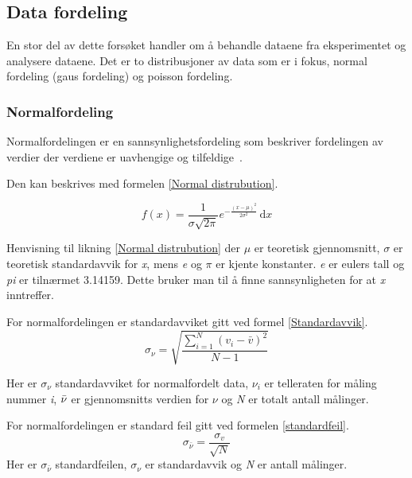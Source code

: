 \documentclass[twocolumn, 11pt]{article} %
\begin{document}
    \subsection{Data fordeling}
    En stor del av dette forsøket handler om å behandle dataene fra eksperimentet og analysere dataene. Det er to distribusjoner av data som er i fokus, normal fordeling (gaus fordeling) og poisson fordeling.

    \subsubsection{Normalfordeling}
    Normalfordelingen er en sannsynlighetsfordeling som beskriver fordelingen av verdier der verdiene er uavhengige og tilfeldige~\cite{normalfordeling}.

    Den kan beskrives med formelen \eqref{Normal distrubution}.

    \begin{equation}
        f(x) = \frac{1}{\sigma\sqrt{2\pi}}{e^{-\frac{(x-\mu)^2}{2\sigma^2}}} \, \mathrm{d}x
    \label{Normal distrubution}
    \end{equation}

    Henvisning til likning \eqref{Normal distrubution} der \textit{$\mu$} er teoretisk gjennomsnitt, \textit{$\sigma$} er teoretisk standardavvik for \textit{x}, mens \textit{e} og \textit{$\pi$} er kjente konstanter. \textit{e} er eulers tall og \textit{pi} er tilnærmet 3.14159. Dette bruker man til å finne sannsynligheten for at \textit{x} inntreffer.

\bigskip

    For normalfordelingen er standardavviket gitt ved formel \eqref{Standardavvik}.
    \begin{equation}
	\sigma_\nu = \sqrt{\frac{\sum_{i=1}^N (v_i - \bar v)^2}{N-1}}\label{Standardavvik}
    \end{equation}

    Her er \textit{$\sigma_\nu$} standardavviket for normalfordelt data, \textit{$\nu_i$} er telleraten for måling nummer \textit{i}, \textit{$\Bar{\nu}$} er gjennomsnitts verdien for \textit{$\nu$} og \textit{N} er totalt antall målinger.

    For normalfordelingen er standard feil gitt ved formelen \eqref{standardfeil}.
    \begin{equation}
	 \sigma_{\bar{\nu}}  = \frac{\sigma_v}{\sqrt{N}}\label{standardfeil}
    \end{equation}
    Her er \textit{$\sigma_{\bar{\nu}}$} standardfeilen, \textit{$\sigma_{\nu}$} er standardavvik og \textit{N} er antall målinger\cite{oppgavetekst}.
\end{document}
